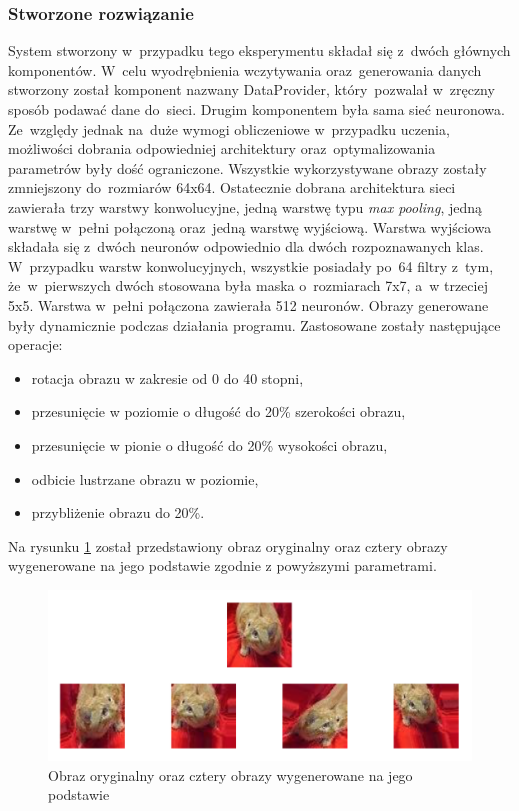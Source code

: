 \subsubsection{Stworzone rozwiązanie}
System stworzony w~przypadku tego eksperymentu składał się z~dwóch głównych komponentów. W~celu wyodrębnienia wczytywania oraz~generowania danych stworzony został komponent nazwany DataProvider, który~pozwalał w~zręczny sposób podawać dane do~sieci. Drugim komponentem była sama sieć neuronowa. Ze~względy jednak na~duże wymogi obliczeniowe w~przypadku uczenia, możliwości dobrania odpowiedniej architektury oraz~optymalizowania parametrów były dość ograniczone. Wszystkie wykorzystywane obrazy zostały zmniejszony do~rozmiarów 64x64. Ostatecznie dobrana architektura sieci zawierała trzy warstwy konwolucyjne, jedną warstwę typu \textit{max pooling}, jedną warstwę w~pełni połączoną  oraz~jedną warstwę wyjściową. Warstwa wyjściowa składała się z~dwóch neuronów odpowiednio dla dwóch rozpoznawanych klas. W~przypadku warstw konwolucyjnych, wszystkie posiadały po~64 filtry z~tym, że~w~pierwszych dwóch stosowana była maska o~rozmiarach 7x7, a~w trzeciej 5x5.  Warstwa w~pełni połączona zawierała 512 neuronów. Obrazy generowane były dynamicznie podczas działania programu. Zastosowane zostały następujące operacje:
\begin{itemize}
\item rotacja obrazu w zakresie od 0 do 40 stopni,
\item przesunięcie w poziomie o długość do 20\% szerokości obrazu,
\item przesunięcie w pionie o długość do 20\% wysokości obrazu,
\item odbicie lustrzane obrazu w poziomie,
\item przybliżenie obrazu do 20\%.
\end{itemize}
Na rysunku \ref{catdogsimages} został przedstawiony obraz oryginalny oraz cztery obrazy wygenerowane na jego podstawie zgodnie z powyższymi parametrami.

\begin{figure}[ht!]
\centering
\includegraphics[scale=0.4]{res/catdogsaug.png}
\caption[Caption for LOF]{Obraz oryginalny oraz cztery obrazy wygenerowane na jego podstawie \label{catdogsimages}}
\end{figure} 

